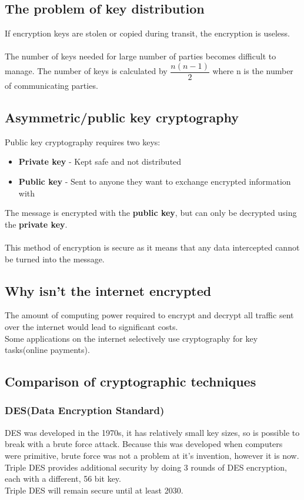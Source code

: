 \documentclass{article}[18pt]
\begin{document}
\subsection{The problem of key distribution}
If encryption keys are stolen or copied during transit, the encryption is useless.\\
\\
The number of keys needed for large number of parties becomes difficult to manage. The number of keys is calculated by $\dfrac{n(n-1)}{2}$ where n is the number of communicating parties.
\subsection{Asymmetric/public key cryptography}
Public key cryptography requires two keys:
\begin{itemize}
\item \textbf{Private key} - Kept safe and not distributed
\item \textbf{Public key} - Sent to anyone they want to exchange encrypted information with
\end{itemize}
The message is encrypted with the \textbf{public key}, but can only be decrypted using the \textbf{private key}.\\
\\
This method of encryption is secure as it means that any data intercepted cannot be turned into the message.
\subsection{Why isn't the internet encrypted}
The amount of computing power required to encrypt and decrypt all traffic sent over the internet would lead to significant costs.\\
Some applications on the internet selectively use cryptography for key tasks(online payments).
\subsection{Comparison of cryptographic techniques}
\subsubsection{DES(Data Encryption Standard)}
DES was developed in the 1970s, it has relatively small key sizes, so is possible to break with a brute force attack. Because this was developed when computers were primitive, brute force was not a problem at it's invention, however it is now.\\
Triple DES provides additional security by doing 3 rounds of DES encryption, each with a different, 56 bit key.\\
Triple DES will remain secure until at least 2030.
\end{document}
